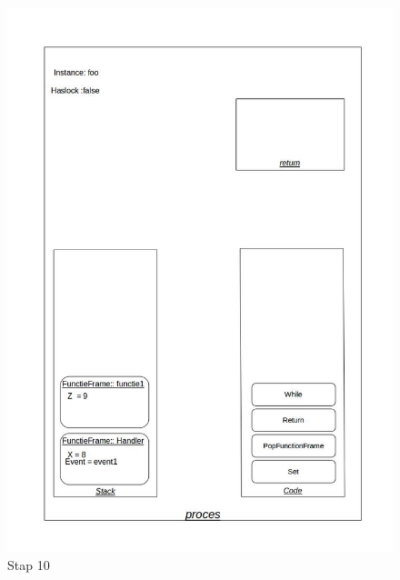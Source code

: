 \documentclass[]{article}
\begin{document}
\begin{figure}[H]
\centering
\includegraphics[scale=0.4]{AnalyseADTAlgorithm/processtappen/stap8.jpg}
\caption{Stap 10}
\end{figure}
\end{document}
